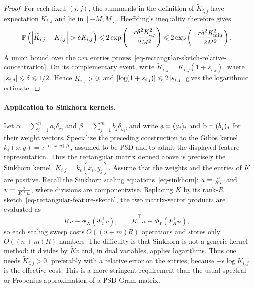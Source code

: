 \begin{proof}
For each fixed \((i,j)\), the summands in the definition of \(\widetilde K_{i,j}\) have expectation \(K_{i,j}\) and lie in \([-M,M]\). Hoeffding's inequality therefore gives
\[
	\mathbb{P}\left( 
		\left\lvert\widetilde K_{i,j}-K_{i,j}\right\rvert>\delta K_{i,j}
	 \right)
	\leqslant
	2\exp\left( -\frac{r\delta^2K_{i,j}^2}{2M^2} \right)
	\leqslant
	2\exp\left( -\frac{r\delta^2K_{\min}^2}{2M^2} \right).
\]
A union bound over the \(nm\) entries proves~\eqref{eq-rectangular-sketch-relative-concentration}. On its complementary event, write \(\widetilde K_{i,j}=K_{i,j}(1+s_{i,j})\), where \(\left\lvert s_{i,j}\right\rvert\leqslant\delta\leqslant1/2\). Hence \(\widetilde K_{i,j}>0\), and \(\left\lvert\log(1+s_{i,j})\right\rvert\leqslant2\left\lvert s_{i,j}\right\rvert\) gives the logarithmic estimate.
\end{proof}

\paragraph{Application to Sinkhorn kernels.}
Let $\alpha=\sum_{i=1}^n a_i\delta_{x_i}$ and $\beta=\sum_{j=1}^m b_j\delta_{y_j}$, and write $\mathrm{a}=(a_i)_i$ and $\mathrm{b}=(b_j)_j$ for their weight vectors.
Specialize the preceding construction to the Gibbs kernel \(k_\epsilon(x,y)=e^{-c(x,y)/\epsilon}\), assumed to be PSD and to admit the displayed feature representation. Thus the rectangular matrix defined above is precisely the Sinkhorn kernel, \(K_{i,j}=k_\epsilon(x_i,y_j)\). Assume that the weights and the entries of \(K\) are positive. Recall the Sinkhorn scaling equations~\eqref{eq-sinkhorn}:
$u=\frac{\mathrm{a}}{Kv}$ and $v=\frac{\mathrm{b}}{K^\top u}$,
where divisions are componentwise. Replacing \(K\) by its rank-\(R\) sketch~\eqref{eq-rectangular-feature-sketch}, the two matrix-vector products are evaluated as
\[
	\widetilde K v=\Phi_X(\Phi_Y^\top v),
	\qquad
	\widetilde K^\top u=\Phi_Y(\Phi_X^\top u),
\]
so each scaling sweep costs \(O((n+m)R)\) operations and stores only \(O((n+m)R)\) numbers. The difficulty is that Sinkhorn is not a generic kernel method: it divides by \(\widetilde K v\) and, in dual variables, applies logarithms. Thus one needs \(\widetilde K_{i,j}>0\), preferably with a relative error on the entries, because \(-\epsilon\log K_{i,j}\) is the effective cost. This is a more stringent requirement than the usual spectral or Frobenius approximation of a PSD Gram matrix.

